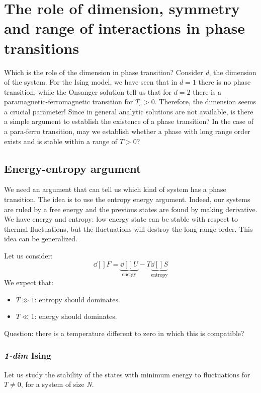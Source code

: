 \documentclass[../main/main.tex]{subfiles}
\begin{document}
\chapter{The role of dimension, symmetry and range of interactions in phase transitions}




Which is the role of the dimension in phase transition? Consider \emph{d}, the dimension of the system.
For the Ising model, we have seen that in \( d=1 \) there is no phase transition, while the Onsanger solution tell us that for \( d=2 \) there is a paramagnetic-ferromagnetic transition for \( T_c >0 \).
Therefore, the dimension seems a crucial parameter!
Since in general analytic solutions are not available, is there a simple argument to establish the existence of a phase transition?
In the case of a para-ferro transition, may we establish whether a phase with long range order exists and is stable within a range of \( T>0 \)?

\section{Energy-entropy argument}
We need an argument that can tell us which kind of system has a phase transition. The idea is to use the entropy energy argument. Indeed, our systems are ruled by a free energy and the previous states are found by making derivative. We have energy and entropy: low energy state can be stable with respect to thermal fluctuations, but the fluctuations will destroy the long range order. This idea can be generalized.

Let us consider: 
\begin{equation}
  \dd[]{F} = \underbrace{\dd[]{U}}_{\text{energy}}  - T \underbrace{ \dd[]{S}}_{\text{entropy}}
\end{equation}
We expect that:
\begin{itemize}
\item \( T \gg 1\): entropy should dominates.
\item \( T \ll 1 \): energy should dominates.
\end{itemize}

\noindent Question: there is a temperature different to zero in which this is compatible?

\subsection{\emph{1-dim} Ising}
Let us study the stability of the states with minimum energy to fluctuations for \( T \neq 0 \), for a system of size  \emph{N}.
\end{document}

